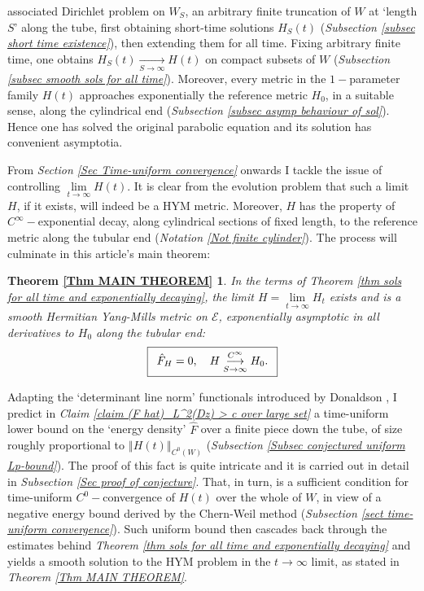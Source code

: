\documentclass{article}
\newcommand{\tublim}{\overset{C^\infty}{\underset{S\rightarrow\infty}{\longrightarrow}}}
\begin{document}
associated Dirichlet problem on $W_{S}$, an arbitrary finite truncation of $W$ at `length $S$' along the tube,
first obtaining short-time solutions $H_{S}\left(
t\right) $ (\emph{Subsection \ref{subsec short time existence}}), then
extending them for all time. Fixing arbitrary finite time, one obtains $%
H_{S}\left( t\right) \underset{S\rightarrow \infty }{\longrightarrow }%
H\left( t\right) $ on compact subsets of $W$ (\emph{Subsection \ref{subsec
smooth sols for all time}}). Moreover, every metric in the $1-$parameter family $%
H\left( t\right) $ approaches exponentially the reference metric $H_{0}$, in
a suitable sense, along the cylindrical end (\emph{Subsection \ref{subsec asymp behaviour of sol}}). Hence one has solved the
original parabolic equation and its solution has convenient asymptotia.

From \emph{Section \ref{Sec Time-uniform convergence} }onwards I
tackle the issue of controlling $\lim\limits_{t\rightarrow \infty }H\left(
t\right) $. It is clear from the evolution problem that such a limit $H$, if it exists, will indeed be a HYM metric. Moreover, $H$ has the property of $C^{\infty}-$exponential decay, along cylindrical sections of fixed length, to the reference metric along the tubular end (\emph{Notation \ref{Not finite cylinder}}). The process will culminate in this article's main theorem: 
\newtheorem*{thm:MAIN}
        {Theorem \ref{Thm MAIN THEOREM} }
\begin{thm:MAIN}
In the terms of \emph{Theorem \ref{thm sols for all time
and exponentially decaying}}, the limit $H=\lim\limits_{t\rightarrow\infty}H_t$ exists and is a smooth Hermitian Yang-Mills metric on  $\mathcal{E}$, exponentially asymptotic  in all derivatives to $H_0$ along the tubular end: %
\begin{equation*}       \index{metric!Hermitian Yang-Mills}
\fbox{$\begin{array}{c}
        \hat{F}_{H}=0, \quad H \tublim H_0. \\
\end{array}$}
\end{equation*}
\end{thm:MAIN}


Adapting the `determinant line norm'
functionals introduced by Donaldson \cite{ASDYM,inf dets stab bdls...}%
, I predict in \emph{Claim \ref{claim (F hat)_L^2(Dz) > c  over large set}} a time-uniform lower bound  on the `energy density' $\hat{F}$ over
a finite piece down the tube, of size roughly proportional to $\left\Vert H(t) \right\Vert_{C^0(W)}$   (\emph{Subsection \ref{Subsec conjectured uniform Lp-bound}}). The proof of this fact is quite intricate and it is carried out in detail in \emph{Subsection \ref{Sec proof of conjecture}}. That, in turn,
is a sufficient condition for time-uniform $C^{0}-$convergence of $%
H\left( t\right) $ over the whole of $W$, in view of a negative  energy bound derived by the Chern-Weil method (\emph{Subsection \ref{sect time-uniform convergence}}). Such uniform bound then cascades back through the estimates behind \emph{Theorem \ref{thm sols for all time and exponentially decaying}} and yields a smooth solution to the HYM
problem in the $t\to\infty$ limit, as stated in \emph{Theorem \ref{Thm MAIN THEOREM}}. 
\end{document}
